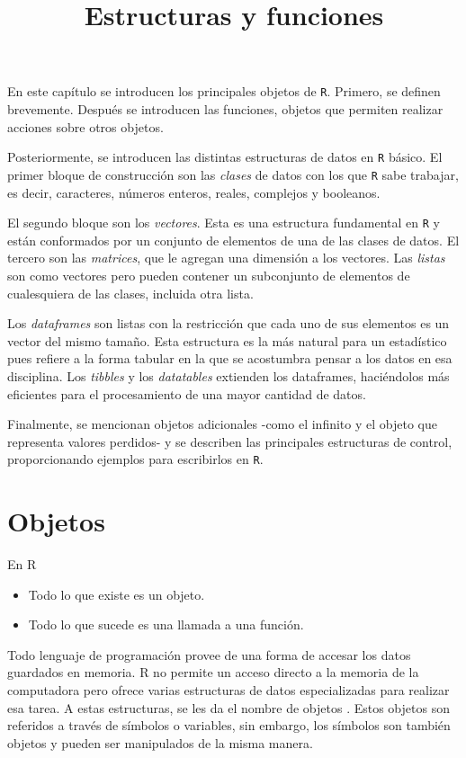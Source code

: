 \documentclass[]{article}
\title{Estructuras y funciones}
\author{}
\date{}
\begin{document}
En este capítulo se introducen los principales objetos de \texttt{R}.
Primero, se definen brevemente. Después se introducen las funciones,
objetos que permiten realizar acciones sobre otros objetos.

Posteriormente, se introducen las distintas estructuras de datos en
\texttt{R} básico. El primer bloque de construcción son las
\emph{clases} de datos con los que \texttt{R} sabe trabajar, es decir,
caracteres, números enteros, reales, complejos y booleanos.

El segundo bloque son los \emph{vectores}. Esta es una estructura
fundamental en \texttt{R} y están conformados por un conjunto de
elementos de una de las clases de datos. El tercero son las
\emph{matrices}, que le agregan una dimensión a los vectores. Las
\emph{listas} son como vectores pero pueden contener un subconjunto de
elementos de cualesquiera de las clases, incluida otra lista.

Los \emph{dataframes} son listas con la restricción que cada uno de sus
elementos es un vector del mismo tamaño. Esta estructura es la más
natural para un estadístico pues refiere a la forma tabular en la que se
acostumbra pensar a los datos en esa disciplina. Los \emph{tibbles} y
los \emph{datatables} extienden los dataframes, haciéndolos más
eficientes para el procesamiento de una mayor cantidad de datos.

Finalmente, se mencionan objetos adicionales -como el infinito y el
objeto que representa valores perdidos- y se describen las principales
estructuras de control, proporcionando ejemplos para escribirlos en
\texttt{R}.

\section{Objetos}\label{objetos}

\renewcommand\bcStyleTitre[1]{\large\textcolor{ttblue}{#1}}

\begin{bclogo}[
  couleur=bgblue,
  arrondi=0,
  logo=\bcattention,
  barre=none,
  noborder=true]{En R}
\begin{itemize}
\item Todo lo que existe es un objeto.
\item Todo lo que sucede es una llamada a una función.
\end{itemize}
\end{bclogo}

Todo lenguaje de programación provee de una forma de accesar los datos
guardados en memoria. R no permite un acceso directo a la memoria de la
computadora pero ofrece varias estructuras de datos especializadas para
realizar esa tarea. A estas estructuras, se les da el nombre de objetos
\parencite[][ver sección 2 ``objetos'']{rmanual}. Estos objetos son
referidos a través de símbolos o variables, sin embargo, los símbolos
son también objetos y pueden ser manipulados de la misma manera.
\end{document}
